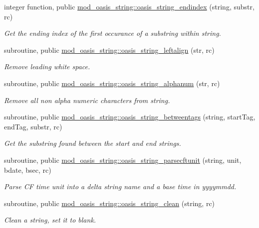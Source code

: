 \begin{DoxyCompactItemize}
integer function, public \hyperlink{namespacemod__oasis__string_a600ed4bd6221a0195d242076217377b4}{mod\+\_\+oasis\+\_\+string\+::oasis\+\_\+string\+\_\+endindex} (string, substr, rc)
\begin{DoxyCompactList}\small\item\em Get the ending index of the first occurance of a substring within string. \end{DoxyCompactList}\item 
subroutine, public \hyperlink{namespacemod__oasis__string_a1d525e36684a0a574b74a2aace51324a}{mod\+\_\+oasis\+\_\+string\+::oasis\+\_\+string\+\_\+leftalign} (str, rc)
\begin{DoxyCompactList}\small\item\em Remove leading white space. \end{DoxyCompactList}\item 
subroutine, public \hyperlink{namespacemod__oasis__string_af123aee419f09309d1ded79ae41243bd}{mod\+\_\+oasis\+\_\+string\+::oasis\+\_\+string\+\_\+alphanum} (str, rc)
\begin{DoxyCompactList}\small\item\em Remove all non alpha numeric characters from string. \end{DoxyCompactList}\item 
subroutine, public \hyperlink{namespacemod__oasis__string_a465ffaf8d7c5462f3de8595934d58c8d}{mod\+\_\+oasis\+\_\+string\+::oasis\+\_\+string\+\_\+betweentags} (string, start\+Tag, end\+Tag, substr, rc)
\begin{DoxyCompactList}\small\item\em Get the substring found between the start and end strings. \end{DoxyCompactList}\item 
subroutine, public \hyperlink{namespacemod__oasis__string_a2f7bae9ccc5d2c48c14f3a1525a6c234}{mod\+\_\+oasis\+\_\+string\+::oasis\+\_\+string\+\_\+parsecftunit} (string, unit, bdate, bsec, rc)
\begin{DoxyCompactList}\small\item\em Parse CF time unit into a delta string name and a base time in yyyymmdd. \end{DoxyCompactList}\item 
subroutine, public \hyperlink{namespacemod__oasis__string_aaf462e055c2c6136ef5d142d03355673}{mod\+\_\+oasis\+\_\+string\+::oasis\+\_\+string\+\_\+clean} (string, rc)
\begin{DoxyCompactList}\small\item\em Clean a string, set it to blank. \end{DoxyCompactList}\item 

\end{DoxyCompactItemize}
